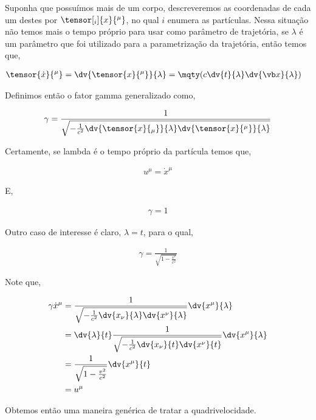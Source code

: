 \documentclass[twoside]{amsart}
\numberwithin{equation}{section}
\begin{document}
\begin{refsection}
Suponha que possuímos mais de um corpo, descreveremos as coordenadas de cada um destes por $\tensor[_i]{x}{^\mu}$, no qual $i$ enumera as partículas. Nessa situação não temos mais o tempo próprio para usar como parâmetro de trajetória, se $\lambda$ é um parâmetro que foi utilizado para a parametrização da trajetória, então temos que,

\begin{align}
    \tensor{\dot{x}}{^\mu}=\dv{\tensor{x}{^\mu}}{\lambda}=\mqty(c\dv{t}{\lambda}&\dv{\vb x}{\lambda})
\end{align}

Definimos então o fator gamma generalizado como,

\begin{align}
    \gamma=\frac{1}{\sqrt{-\frac{1}{c^2}\dv{\tensor{x}{_\mu}}{\lambda}\dv{\tensor{x}{^\mu}}{\lambda}}}
\end{align}

Certamente, se lambda é o tempo próprio da partícula temos que,

\begin{align}
    u^\mu=\dot{x}^\mu
\end{align}

E,

\begin{align}
    \gamma=1
\end{align}

Outro caso de interesse é claro, $\lambda=t$, para o qual,

\begin{align}
    \gamma=\frac{1}{\sqrt{1-\frac{v^2}{c^2}}}
\end{align}

Note que,

\begin{align}
    \gamma \dot{x}^\mu&=\frac{1}{\sqrt{-\frac{1}{c^2}\dv{x_\nu}{\lambda}\dv{x^\nu}{\lambda}}}\dv{x^\mu}{\lambda}\\
    &=\dv{\lambda}{t}\frac{1}{\sqrt{-\frac{1}{c^2}\dv{x_\nu}{t}\dv{x^\nu}{t}}}\dv{x^\mu}{\lambda}\\
    &=\frac{1}{\sqrt{1-\frac{v^2}{c^2}}}\dv{x^\mu}{t}\\
    &=u^\mu
\end{align}

Obtemos então uma maneira genérica de tratar a quadrivelocidade.

\printbibliography[heading=subbibliography]
\end{refsection}

\end{document}
